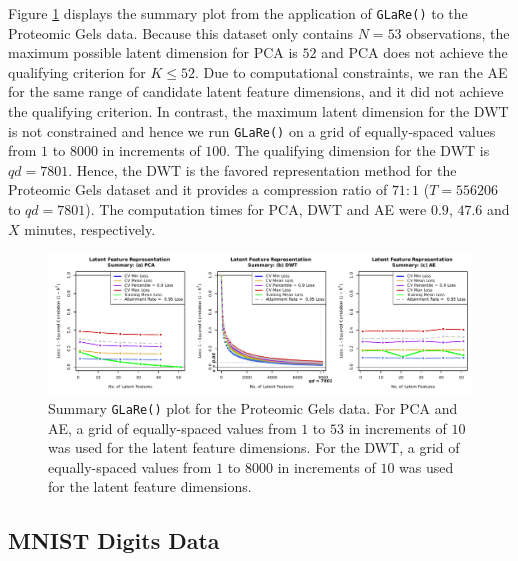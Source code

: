Figure \ref{fig:gels-results} displays the summary plot from the application of \texttt{GLaRe()} to the Proteomic Gels data.
Because this dataset only contains $N=53$ observations, the maximum possible latent dimension for PCA is $52$ and PCA does not achieve the qualifying criterion for $K \leq 52$.
Due to computational constraints, we ran the AE for the same range of candidate latent feature dimensions, and it did not achieve the qualifying criterion.
In contrast, the maximum latent dimension for the DWT is not constrained and hence we run \texttt{GLaRe()} on a grid of equally-spaced values from $1$ to $8000$ in increments of $100$.
The qualifying dimension for the DWT is $qd=7801$.
Hence, the DWT is the favored representation method for the Proteomic Gels dataset and it provides a compression ratio of $71:1$ ($T = 556206$ to $qd = 7801$).
The computation times for PCA, DWT and AE were $0.9$, $47.6$ and {\color{purple}$X$} minutes, respectively.


\begin{figure}
    \centering
    \includegraphics[width=1\linewidth]{figures/gels-results.pdf}
    \caption{Summary \texttt{GLaRe()} plot for the Proteomic Gels data. For PCA and AE, a grid of equally-spaced values from $1$ to $53$ in increments of $10$ was used for the latent feature dimensions.
    For the DWT,  a grid of equally-spaced values from $1$ to $8000$ in increments of $10$ was used for the latent feature dimensions.}
    \label{fig:gels-results}
\end{figure}


\subsection{MNIST Digits Data}

